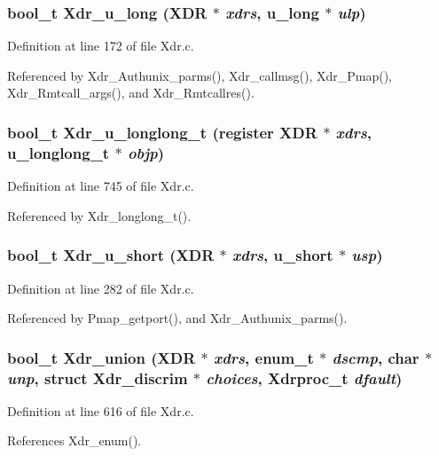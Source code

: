 \subsubsection{\setlength{\rightskip}{0pt plus 5cm}bool\_\-t Xdr\_\-u\_\-long (XDR $\ast$ {\em xdrs}, u\_\-long $\ast$ {\em ulp})}\label{Xdr_8c_a9}




Definition at line 172 of file Xdr.c.

Referenced by Xdr\_\-Authunix\_\-parms(), Xdr\_\-callmsg(), Xdr\_\-Pmap(), Xdr\_\-Rmtcall\_\-args(), and Xdr\_\-Rmtcallres().
\subsubsection{\setlength{\rightskip}{0pt plus 5cm}bool\_\-t Xdr\_\-u\_\-longlong\_\-t (register XDR $\ast$ {\em xdrs}, u\_\-longlong\_\-t $\ast$ {\em objp})}\label{Xdr_8c_a26}




Definition at line 745 of file Xdr.c.

Referenced by Xdr\_\-longlong\_\-t().
\subsubsection{\setlength{\rightskip}{0pt plus 5cm}bool\_\-t Xdr\_\-u\_\-short (XDR $\ast$ {\em xdrs}, u\_\-short $\ast$ {\em usp})}\label{Xdr_8c_a13}




Definition at line 282 of file Xdr.c.

Referenced by Pmap\_\-getport(), and Xdr\_\-Authunix\_\-parms().
\subsubsection{\setlength{\rightskip}{0pt plus 5cm}bool\_\-t Xdr\_\-union (XDR $\ast$ {\em xdrs}, enum\_\-t $\ast$ {\em dscmp}, char $\ast$ {\em unp}, struct Xdr\_\-discrim $\ast$ {\em choices}, Xdrproc\_\-t {\em dfault})}\label{Xdr_8c_a23}




Definition at line 616 of file Xdr.c.

References Xdr\_\-enum().

